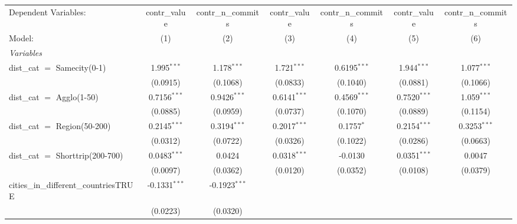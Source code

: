 
\begingroup
\centering
\begin{tabular}{lcccccc}
   \tabularnewline \midrule \midrule
   Dependent Variables:                                   & contr\_value    & contr\_n\_commits   & contr\_value   & contr\_n\_commits   & contr\_value    & contr\_n\_commits\\    
   Model:                                                 & (1)             & (2)                 & (3)            & (4)                 & (5)             & (6)\\  
   \midrule
   \emph{Variables}\\
   dist\_cat $=$ Samecity(0-1)                            & 1.995$^{***}$   & 1.178$^{***}$       & 1.721$^{***}$  & 0.6195$^{***}$      & 1.944$^{***}$   & 1.077$^{***}$\\   
                                                          & (0.0915)        & (0.1068)            & (0.0833)       & (0.1040)            & (0.0881)        & (0.1066)\\   
   dist\_cat $=$ Agglo(1-50)                              & 0.7156$^{***}$  & 0.9426$^{***}$      & 0.6141$^{***}$ & 0.4569$^{***}$      & 0.7520$^{***}$  & 1.059$^{***}$\\   
                                                          & (0.0885)        & (0.0959)            & (0.0737)       & (0.1070)            & (0.0889)        & (0.1154)\\   
   dist\_cat $=$ Region(50-200)                           & 0.2145$^{***}$  & 0.3194$^{***}$      & 0.2017$^{***}$ & 0.1757$^{*}$        & 0.2154$^{***}$  & 0.3253$^{***}$\\   
                                                          & (0.0312)        & (0.0722)            & (0.0326)       & (0.1022)            & (0.0286)        & (0.0663)\\   
   dist\_cat $=$ Shorttrip(200-700)                       & 0.0483$^{***}$  & 0.0424              & 0.0318$^{***}$ & -0.0130             & 0.0351$^{***}$  & 0.0047\\   
                                                          & (0.0097)        & (0.0362)            & (0.0120)       & (0.0352)            & (0.0108)        & (0.0379)\\   
   cities\_in\_different\_countriesTRUE                   & -0.1331$^{***}$ & -0.1923$^{***}$     &                &                     &                 &   \\   
                                                          & (0.0223)        & (0.0320)            &                &                     &                 &   \\   

\end{tabular}
